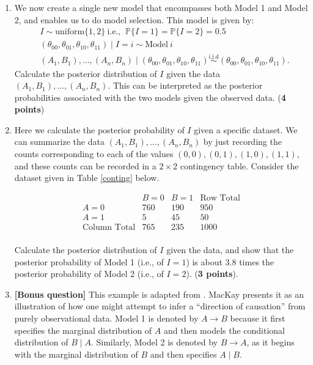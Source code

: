 \documentclass{scrartcl}
\renewcommand{\P}{{\mathbb P}}
\begin{document}
\begin{enumerate}
\begin{enumerate}
    $N_{00}, N_{01}, N_{10}, N_{11}$ denote the observed counts for the
    four cases $(0, 0), (0, 1), (1, 0), (1, 1)$. Write down the
    posterior density of $(\theta_{00}, \theta_{01}, \theta_{10},
    \theta_{11})$ under each model (Model 1 and Model 2). (\textbf{4
      points}).
  \item We now create a single new model that encompasses both Model 1
    and Model 2, and enables us to do model selection. This model is
    given by:
    \begin{align*}
   &   I \sim \text{uniform}\{1, 2\} ~\text{i.e., }~ \P\{I = 1\} =
     \P\{I = 2\} = 0.5 \\
   & (\theta_{00}, \theta_{01}, \theta_{10}, \theta_{11}) \mid I = i
     \sim \text{Model}~i \\
   & (A_1, B_1), \dots, (A_{n}, B_n) \mid (\theta_{00}, \theta_{01},
     \theta_{10}, \theta_{11}) \overset{\text{i.i.d}}{\sim} (\theta_{00}, \theta_{01},
     \theta_{10}, \theta_{11}). 
    \end{align*}
    Calculate the posterior distribution of $I$ given the data $(A_1,
    B_1), \dots, (A_{n}, B_n)$. This can be interpreted as the posterior
    probabilities associated with the two models given the observed
    data. (\textbf{4 points})
  \item Here we calculate the posterior probability of $I$ given a
    specific dataset. We can summarize the data $(A_1, B_1), \dots,
    (A_n, B_n)$ by just recording the counts corresponding to each of
    the values $(0, 0), (0, 1), (1, 0), (1, 1)$, and these 
  counts can be recorded in a $2 \times 2$ contingency table. Consider
  the dataset given in Table \ref{conting} below. 
\begin{table}[ht]
\centering
\[
\begin{array}{c|cc|c}
 & B=0 & B=1 & \text{Row Total} \\
\hline
A=0 & 760 & 190 & 950 \\
A=1 & 5   & 45  & 50 \\
\hline
\text{Column Total} & 765 & 235 & 1000 \\
\end{array}
\]
\caption{Contingency table for binary variables $A$ and $B$}
\label{conting}
\end{table}
Calculate the posterior distribution of $I$ given the data, and show
that the posterior probability of Model 1 (i.e., of $I = 1$) is about
3.8 times the posterior probability of Model 2 (i.e., of $I =
2$). (\textbf{3 points}).
\item \textbf{[Bonus question]} This example is adapted from
  \citet[Exercise 35.5, p. 447]{MacKay}. MacKay presents it as an
  illustration of how one might attempt to infer a “direction of
  causation” from purely observational data. Model 1 is denoted by $A
  \rightarrow B$ because it first specifies the marginal distribution
  of $A$ and then models the conditional distribution of $B \mid
  A$. Similarly, Model 2 is denoted by $B \rightarrow A$, as it begins
  with the marginal distribution of $B$ and then specifies $A \mid
  B$. 


\end{enumerate}
\end{enumerate}
\end{document}
